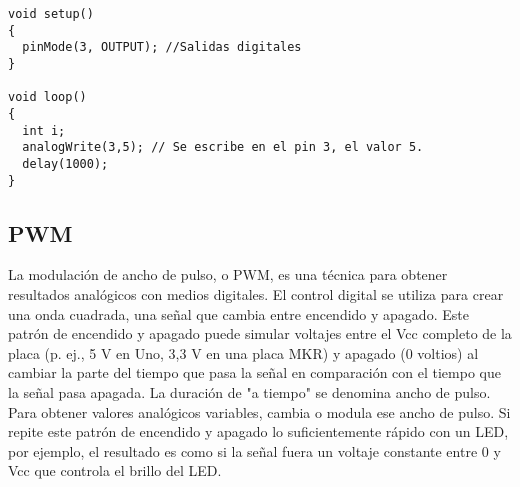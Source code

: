 \begin{lstlisting}[style=cFrameTB, gobble=4]
void setup()
{
  pinMode(3, OUTPUT); //Salidas digitales
}

void loop()
{
  int i;
  analogWrite(3,5); // Se escribe en el pin 3, el valor 5.
  delay(1000);
}
\end{lstlisting}
\subsection{PWM}

La modulación de ancho de pulso, o PWM, es una técnica para obtener resultados analógicos con medios digitales. El control digital se utiliza para crear una onda cuadrada, una señal que cambia entre encendido y apagado. Este patrón de encendido y apagado puede simular voltajes entre el Vcc completo de la placa (p. ej., 5 V en Uno, 3,3 V en una placa MKR) y apagado (0 voltios) al cambiar la parte del tiempo que pasa la señal en comparación con el tiempo que la señal pasa apagada. La duración de "a tiempo" se denomina ancho de pulso. Para obtener valores analógicos variables, cambia o modula ese ancho de pulso. Si repite este patrón de encendido y apagado lo suficientemente rápido con un LED, por ejemplo, el resultado es como si la señal fuera un voltaje constante entre 0 y Vcc que controla el brillo del LED.

